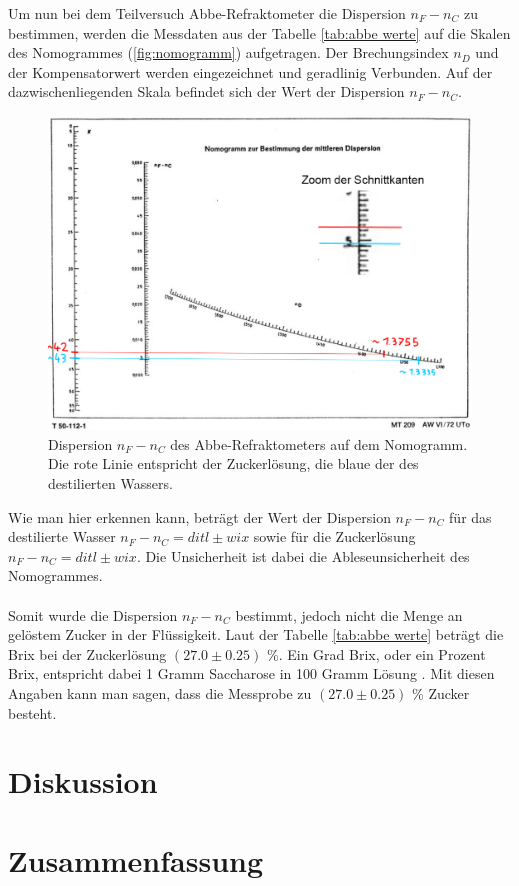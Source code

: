 \documentclass[12pt,a4paper,twoside]{article}
\begin{document}
\noindent
Um nun bei dem Teilversuch Abbe-Refraktometer die Dispersion $n_F-n_C$ zu bestimmen, werden die Messdaten aus der Tabelle \ref{tab:abbe werte} auf die Skalen des Nomogrammes (\ref{fig:nomogramm}) aufgetragen. 
Der Brechungsindex $n_D$ und der Kompensatorwert werden eingezeichnet und geradlinig Verbunden. 
Auf der dazwischenliegenden Skala befindet sich der Wert der Dispersion $n_F-n_C$. 

\begin{figure}[H]
    \centering
    \includegraphics[width=0.6\linewidth]{nudes/nomogramm_auswertung.jpg}
    \caption{Dispersion $n_F-n_C$ des Abbe-Refraktometers auf dem Nomogramm. Die rote Linie entspricht der Zuckerlösung, die blaue der des destilierten Wassers. }
    \label{fig:nomogramm_auswertung}
\end{figure}

\noindent
Wie man hier erkennen kann, beträgt der Wert der Dispersion $n_F-n_C$ für das destilierte Wasser $n_F-n_C = ditl \pm wix$ sowie für die Zuckerlösung $n_F-n_C = ditl \pm wix$. 
Die Unsicherheit ist dabei die Ableseunsicherheit des Nomogrammes. 
\\
\\
Somit wurde die Dispersion $n_F-n_C$ bestimmt, jedoch nicht die Menge an gelöstem Zucker in der Flüssigkeit. 
Laut der Tabelle \ref{tab:abbe werte} beträgt die Brix bei der Zuckerlösung $(27.0 \pm 0.25)$ \%. 
Ein Grad Brix, oder ein Prozent Brix, entspricht dabei 1 Gramm Saccharose in 100 Gramm Lösung \cite{Brix}. 
Mit diesen Angaben kann man sagen, dass die Messprobe zu $(27.0 \pm 0.25)$ \% Zucker besteht. 


\section{Diskussion} %


\section{Zusammenfassung} %
\end{document}
